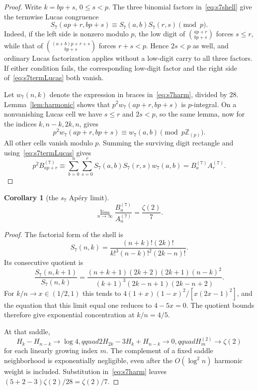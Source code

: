 \documentclass[11pt,reqno]{amsart}
\newtheorem{corollary}[theorem]{Corollary}
\theoremstyle{definition}
\theoremstyle{remark}
\newcommand{\Zp}{\mathbb Z_{(p)}}
\begin{document}
\begin{proof}
Write $k=bp+s$, $0\leq s<p$.  The three binomial factors in~\eqref{eq:s7shell}
give the termwise Lucas congruence
\begin{equation}\label{eq:s7termLucas}
 S_7(ap+r,bp+s)\equiv S_7(a,b)S_7(r,s)\pmod p.
\end{equation}
Indeed, if the left side is nonzero modulo $p$, the low digit of
$\binom{ap+r}{bp+s}$ forces $s\leq r$, while that of
$\binom{(a+b)p+r+s}{bp+s}$ forces $r+s<p$.  Hence $2s<p$ as well, and ordinary
Lucas factorization applies without a low-digit carry to all three factors.
If either condition fails, the corresponding low-digit factor and the right
side of~\eqref{eq:s7termLucas} both vanish.

Let $w_7(n,k)$ denote the expression in braces in~\eqref{eq:s7harm}, divided
by $28$.  Lemma~\ref{lem:harmonic} shows that $p^2w_7(ap+r,bp+s)$ is
$p$-integral.  On a nonvanishing Lucas cell we have $s\leq r$ and $2s<p$, so
the same lemma, now for the indices $k,n-k,2k,n$, gives
\[
 p^2w_7(ap+r,bp+s)\equiv w_7(a,b)\pmod {p\Zp}.
\]
All other cells vanish modulo $p$.  Summing the surviving digit rectangle and
using~\eqref{eq:s7termLucas} gives
\[
 p^2B_{ap+r}^{(7)}\equiv
 \sum_{b=0}^a\sum_{s=0}^rS_7(a,b)S_7(r,s)w_7(a,b)
 =B_a^{(7)}A_r^{(7)}.
\]
\end{proof}

\begin{corollary}[the $s_7$ Ap\'ery limit]\label{cor:s7limit}
\begin{equation}\label{eq:s7limit}
 \lim_{n\to\infty}\frac{B_n^{(7)}}{A_n^{(7)}}=\frac{\zeta(2)}7.
\end{equation}
\end{corollary}

\begin{proof}
The factorial form of the shell is
\[
 S_7(n,k)=\frac{(n+k)!(2k)!}{k!^3(n-k)!^2(2k-n)!}.
\]
Its consecutive quotient is
\[
 \frac{S_7(n,k+1)}{S_7(n,k)}
 =\frac{(n+k+1)(2k+2)(2k+1)(n-k)^2}
 {(k+1)^3(2k-n+1)(2k-n+2)}.
\]
For $k/n\to x\in(1/2,1)$ this tends to
$4(1+x)(1-x)^2/[x(2x-1)^2]$, and the equation that this limit equal one
reduces to $4-5x=0$.  The quotient bounds therefore give exponential
concentration at $k/n=4/5$.

At that saddle,
\[
 H_k-H_{n-k}\longrightarrow\log4,qquad
 2H_{2k}-3H_k+H_{n-k}\longrightarrow0,qquad
 H_m^{(2)}\longrightarrow\zeta(2)
\]
for each linearly growing index $m$.  The complement of a fixed saddle
neighborhood is exponentially negligible, even after the $O(\log^2 n)$
harmonic weight is included.  Substitution in~\eqref{eq:s7harm} leaves
$(5+2-3)\zeta(2)/28=\zeta(2)/7$.
\end{proof}
\end{document}
